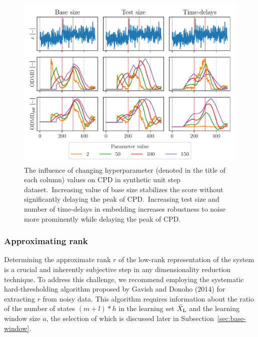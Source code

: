 \begin{figure}[H]
	\centering
	\includegraphics[width=\linewidth]{figures/Unit step-parameters-influence-ref_size_test_size_hn.pdf}
	\caption{The influence of changing hyperparameter (denoted in the title of each column) values on CPD in synthetic unit step dataset.~Increasing value of base size stabilizes the score without significantly delaying the peak of CPD.~Increasing test size and number of time-delays in embedding increases robustness to noise more prominently while delaying the peak of CPD.}\label{fig:hyperparameters}
\end{figure}

\subsubsection{Approximating rank}
Determining the approximate rank \( r \) of the low-rank representation of the system is a crucial and inherently subjective step in any dimensionality reduction technique. To address this challenge, we recommend employing the systematic hard-thresholding algorithm proposed by Gavish and Donoho (2014) for extracting \( r \) from noisy data. This algorithm requires information about the ratio of the number of states \((m + l) * h\) in the learning set \(\bar{X} _{\text{L}}\) and the learning window size \(a\), the selection of which is discussed later in Subsection~\ref{sec:base-window}.


